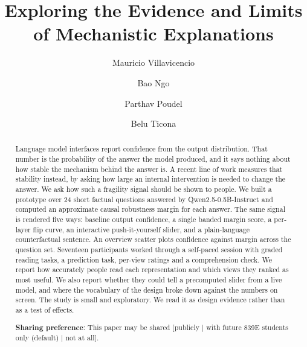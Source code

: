 \documentclass[sigconf]{acmart}
\newcommand{\guideline}[1]{\textit{\color{paperblue}{#1}}}
\begin{document}
\title{Exploring the Evidence and Limits of Mechanistic Explanations}

\author{Mauricio Villavicencio}

\author{Bao Ngo}

\author{Parthav Poudel}

\author{Belu Ticona}

\begin{abstract}

\guideline{DRAFT abstract, 210 words. Rewrite the last two sentences once the results section is final.}

\noindent Language model interfaces report confidence from the output distribution. That number is the
probability of the answer the model produced, and it says nothing about how stable the mechanism behind the
answer is. A recent line of work measures that stability instead, by asking how large an internal intervention
is needed to change the answer. We ask how such a fragility signal should be shown to people. We built a
prototype over 24 short factual questions answered by Qwen2.5-0.5B-Instruct and computed an approximate causal
robustness margin for each answer. The same signal is rendered five ways: baseline output confidence, a single
banded margin score, a per-layer flip curve, an interactive push-it-yourself slider, and a plain-language
counterfactual sentence. An overview scatter plots confidence against margin across the question set.
Seventeen participants worked through a self-paced session with graded reading tasks, a prediction task,
per-view ratings and a comprehension check. We report how accurately people read each representation and which
views they ranked as most useful. We also report whether they could tell a precomputed slider from a live
model, and where the vocabulary of the design broke down against the numbers on screen. The study is small and
exploratory. We read it as design evidence rather than as a test of effects.

\noindent \textbf{Sharing preference}: This paper may be shared [publicly | with future 839E students only (default) | not at all].
\end{abstract}
\end{document}
